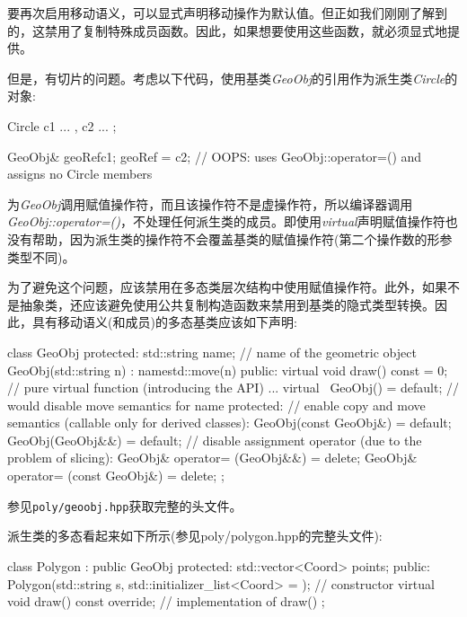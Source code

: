 要再次启用移动语义，可以显式声明移动操作为默认值。但正如我们刚刚了解到的，这禁用了复制特殊成员函数。因此，如果想要使用这些函数，就必须显式地提供。\par


但是，有切片的问题。考虑以下代码，使用基类\textit{GeoObj}的引用作为派生类\textit{Circle}的对象:\par

\begin{codebox}[cpp]
Circle c1{ ... }, c2{ ... };

GeoObj& geoRef{c1};
geoRef = c2; // OOPS: uses GeoObj::operator=() and assigns no Circle members
\end{codebox}

为\textit{GeoObj}调用赋值操作符，而且该操作符不是虚操作符，所以编译器调用\textit{GeoObj::\allowbreak{}operator=\allowbreak{}(\allowbreak{})\allowbreak{}}，不处理任何派生类的成员。即使用\textit{virtual}声明赋值操作符也没有帮助，因为派生类的操作符不会覆盖基类的赋值操作符(第二个操作数的形参类型不同)。\par

为了避免这个问题，应该禁用在多态类层次结构中使用赋值操作符。此外，如果不是抽象类，还应该避免使用公共复制构造函数来禁用到基类的隐式类型转换。因此，具有移动语义(和成员)的多态基类应该如下声明:\par

\begin{codebox}[cpp]
class GeoObj {
protected:
  std::string name; // name of the geometric object
  GeoObj(std::string n)
  : name{std::move(n)} {
  }
public:
  virtual void draw() const = 0; // pure virtual function (introducing the API)
  ...
  virtual ~GeoObj() = default; // would disable move semantics for name
protected:
  // enable copy and move semantics (callable only for derived classes):
  GeoObj(const GeoObj&) = default;
  GeoObj(GeoObj&&) = default;
  // disable assignment operator (due to the problem of slicing):
  GeoObj& operator= (GeoObj&&) = delete;
  GeoObj& operator= (const GeoObj&) = delete;
};
\end{codebox}

参见\texttt{poly/\allowbreak{}geoobj.hpp}获取完整的头文件。


派生类的多态看起来如下所示(参见poly/polygon.hpp的完整头文件):\par

\begin{codebox}[cpp]
class Polygon : public GeoObj {
protected:
  std::vector<Coord> points;
public:
  Polygon(std::string s, std::initializer_list<Coord> = {}); // constructor
  virtual void draw() const override; // implementation of draw()
};
\end{codebox}

